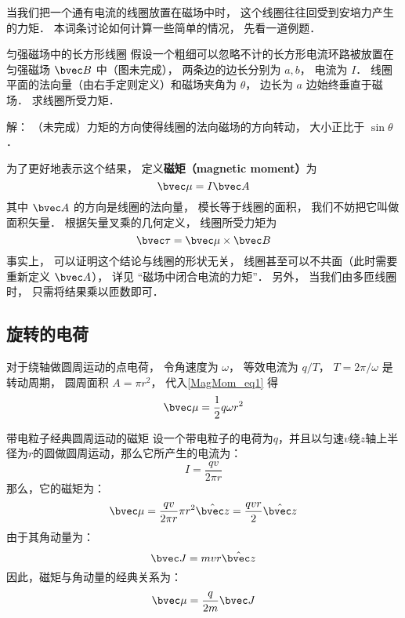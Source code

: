 
\begin{issues}
\issueTODO
\end{issues}


当我们把一个通有电流的线圈放置在磁场中时， 这个线圈往往回受到安培力产生的力矩． 本词条讨论如何计算一些简单的情况， 先看一道例题．

\begin{example}{匀强磁场中的长方形线圈}
假设一个粗细可以忽略不计的长方形电流环路被放置在匀强磁场 $\bvec B$ 中（图未完成）， 两条边的边长分别为 $a, b$， 电流为 $I$． 线圈平面的法向量（由右手定则定义）和磁场夹角为 $\theta$， 边长为 $a$ 边始终垂直于磁场． 求线圈所受力矩．

解： （未完成）力矩的方向使得线圈的法向磁场的方向转动， 大小正比于 $\sin\theta$．
\end{example}

为了更好地表示这个结果， 定义\textbf{磁矩（magnetic moment）}为
\begin{equation}\label{MagMom_eq1}
\bvec \mu = I \bvec A
\end{equation}
其中 $\bvec A$ 的方向是线圈的法向量， 模长等于线圈的面积， 我们不妨把它叫做面积矢量． 根据矢量叉乘的几何定义， 线圈所受力矩为
\begin{equation}
\bvec \tau = \bvec \mu \times \bvec B
\end{equation}
事实上， 可以证明这个结论与线圈的形状无关， 线圈甚至可以不共面（此时需要重新定义 $\bvec A$）， 详见 “磁场中闭合电流的力矩”． 另外， 当我们由多匝线圈时， 只需将结果乘以匝数即可．

\subsection{旋转的电荷}
对于绕轴做圆周运动的点电荷， 令角速度为 $\omega$， 等效电流为 $q/T$， $T = 2\pi/\omega$ 是转动周期， 圆周面积 $A = \pi r^2$， 代入\autoref{MagMom_eq1} 得
\begin{equation}
\bvec \mu = \frac{1}{2} q\omega r^2
\end{equation}

\begin{example}{带电粒子经典圆周运动的磁矩}
设一个带电粒子的电荷为$q$，并且以匀速$v$绕$z$轴上半径为$r$的圆做圆周运动，那么它所产生的电流为：
\begin{equation}
I=\frac{qv}{2\pi r}
\end{equation}
那么，它的磁矩为：
\begin{equation}
\bvec\mu  = \frac{qv}{2\pi r}\pi r^2 \hat{\bvec z}=\frac{qvr}{2} \hat{\bvec z} 
\end{equation}
由于其角动量为：
\begin{equation}
\bvec J =mvr\hat{\bvec z}
\end{equation}
因此，磁矩与角动量的经典关系为：
\begin{equation}
\bvec\mu  = \frac{q}{2m}\bvec J
\end{equation}

\end{example}
